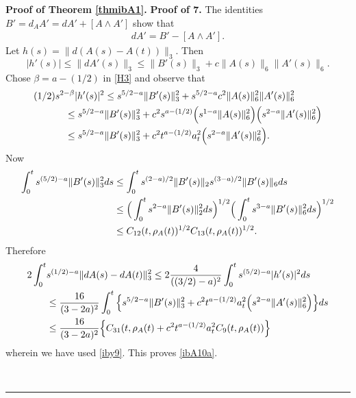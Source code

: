 \documentclass[12pt]{article}
\newenvironment{proof}[1][Proof]{\textbf{#1.} }{\ \rule{0.5em}{0.5em}}
\def \({\Big(}
\def \){\Big)}
\def \beq{\begin{equation}}
\def \eeq{\end{equation}}
\def \eref{\eqref}
\numberwithin{equation}{section}
\begin{document}
\begin{proof}[Proof of Theorem \ref{thmibA1}]
 \bigskip
\noindent
{\bf Proof of 7.}   
   The identities  $B' = d_A A' = dA' + [A\wedge A']$ show that
\begin{align}
dA' = B' - [A\wedge A'].       \label{ibA40b}
\end{align} 
  Let $h(s) = \|d(A(s) - A(t))\|_3$.    
 Then 
 \beq
 |h'(s)| \le \| dA'(s)\|_3 \le \|B'(s)\|_3 + c \|A(s)\|_6 \| A'(s)\|_6.
 \eeq
 Chose $\beta = a - (1/2)$ in \eref{H3} and observe that 
  \begin{align}
(1/2)  s^{2- \beta}|h'(s)|^2 
&\le  s^{5/2 -a}\|B'(s)\|_3^2 + s^{5/2 -a} c^2 \|A(s)\|_6^2 \| A'(s)\|_6^2 \notag \\
\le   s^{5/2 -a}&\|B'(s)\|_3^2  + c^2 s^{a-(1/2)} \(s^{1-a}\|A(s)\|_6^2 \) \(s^{2-a}\| A'(s)\|_6^2\) \notag\\
\le   s^{5/2 -a}&\|B'(s)\|_3^2  + c^2 t^{a-(1/2)} a_t^2  \(s^{2-a}\| A'(s)\|_6^2\).   \notag
  \end{align}
  Now
\begin{align}
  \int_0^t s^{(5/2) -a}  \|B'(s)\|_3^2 ds &\le \int_0^t s^{(2 - a)/2}  \|B'(s)\|_2 s^{(3-a)/2}\| B'(s)\|_6 ds \notag\\
  &\le \(\int_0^t s^{2-a} \|B'(s)\|_2^2 ds\)^{1/2}\( \int_0^t s^{3-a}   \| B'(s)\|_6^2 ds\)^{1/2}   \notag \\
  &\le C_{12}(t, \rho_A(t))^{1/2}  C_{13}(t, \rho_A(t))^{1/2} . 
                               \label{ibA82}
  \end{align}
  Therefore 
  \begin{align*}
  2\int_0^t &s^{(1/2) - a} \| dA(s) - dA(t)\|_3^2 
  \le  2 \frac{4}{((3/2) -a)^2}\int_0^t s^{(5/2) -a} |h'(s)|^2 ds \notag \\
  &\le \frac{16}{(3 -2a)^2} \int_0^t \Big\{s^{5/2 -a}\|B'(s)\|_3^2  
         + c^2 t^{a-(1/2)} a_t^2  \(s^{2-a}\| A'(s)\|_6^2\)\Big\} ds \notag \\
 &\le \frac{16}{(3 -2a)^2}  \Big\{C_{31}(t,\rho_A(t)  + c^2 t^{a-(1/2)} a_t^2 C_9(t, \rho_A(t))\Big\}
  \end{align*}
  wherein we have used \eref{iby9}. This proves \eref{ibA10a}.
  
 
  
  



\end{proof}
\end{document}
